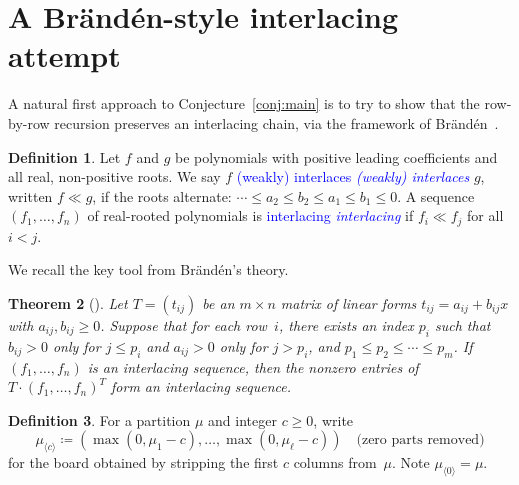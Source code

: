 \documentclass[11pt,reqno]{amsart}
\newtheorem{theorem}{Theorem}[section]
\theoremstyle{definition}
\newtheorem{definition}[theorem]{Definition}
\newcommand{\defin}[1]{%
\relax\ifmmode%
\textcolor{blue}{#1}%
\else \textcolor{blue}{\emph{#1}}%
\fi%
}
\newcommand{\interl}{\ll}
\begin{document}
\section{A Br\"and\'en-style interlacing attempt}

A natural first approach to Conjecture~\ref{conj:main}
is to try to show that the row-by-row recursion preserves
an interlacing chain, via the framework of Br\"and\'en~\cite{Branden2015}.

\begin{definition}\label{def:interlacing}
Let $f$ and $g$ be polynomials with positive leading coefficients and
all real, non-positive roots.
We say $f$ \defin{(weakly) interlaces} $g$, written $f \interl g$,
if the roots alternate: $\dotsb \leq a_2 \leq b_2 \leq a_1 \leq b_1 \leq 0$.
A sequence $(f_1, \dotsc, f_n)$ of real-rooted polynomials is
\defin{interlacing} if $f_i \interl f_j$ for all $i < j$.
\end{definition}

We recall the key tool from Br\"and\'en's theory.

\begin{theorem}[{\cite[Cor.~8.7]{Branden2015}}]\label{thm:branden}
Let $T = (t_{ij})$ be an $m \times n$ matrix of linear forms
$t_{ij} = a_{ij} + b_{ij} x$ with $a_{ij}, b_{ij} \geq 0$.
Suppose that for each row~$i$, there exists an index $p_i$ such that
$b_{ij} > 0$ only for $j \leq p_i$ and
$a_{ij} > 0$ only for $j > p_i$,
and $p_1 \leq p_2 \leq \dotsb \leq p_m$.
If $(f_1, \dotsc, f_n)$ is an interlacing sequence,
then the nonzero entries of $T \cdot (f_1, \dotsc, f_n)^T$
form an interlacing sequence.
\end{theorem}

\begin{definition}
For a partition $\mu$ and integer $c \geq 0$, write
\[
  \mu_{\langle c \rangle} \coloneqq
  (\max(0, \mu_1 {-} c), \dotsc, \max(0, \mu_\ell {-} c))
  \quad\text{(zero parts removed)}
\]
for the board obtained by stripping the first $c$ columns from~$\mu$.
Note $\mu_{\langle 0 \rangle} = \mu$.
\end{definition}
\end{document}
